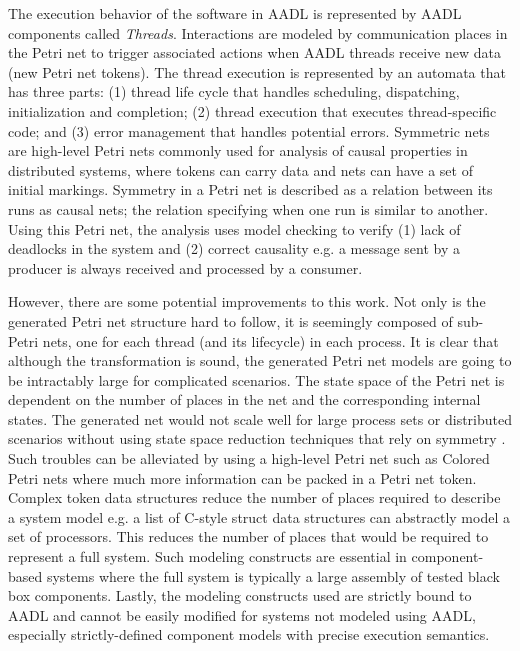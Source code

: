 The execution behavior of the software in AADL is represented by AADL components
called \emph{Threads}. Interactions are modeled by communication places in the
Petri net to trigger associated actions when AADL threads receive new data (new
Petri net tokens). The thread execution is represented by an automata that has
three parts: (1) thread life cycle that handles scheduling, dispatching,
initialization and completion; (2) thread execution that executes
thread-specific code; and (3) error management that handles potential errors.
Symmetric nets \cite{hayman2008symmetry, winskel2009events} are high-level Petri
nets commonly used for analysis of causal properties in distributed systems,
where tokens can carry data and nets can have a set of initial markings.
Symmetry in a Petri net is described as a relation between its runs as causal
nets; the relation specifying when one run is similar to another. Using this
Petri net, the analysis uses model checking to verify (1) lack of deadlocks in
the system and (2) correct causality e.g. a message sent by a producer is always
received and processed by a consumer.

However, there are some potential improvements to this work. Not only is the
generated Petri net structure hard to follow, it is seemingly composed of
sub-Petri nets, one for each thread (and its lifecycle) in each process. It is
clear that although the transformation is sound, the generated Petri net models
are going to be intractably large for complicated scenarios. The state space of
the Petri net is dependent on the number of places in the net and the
corresponding internal states. The generated net would not scale well for large
process sets or distributed scenarios without using state space reduction
techniques that rely on symmetry \cite{sistla2004symmetry}. Such troubles can be
alleviated by using a high-level Petri net such as Colored Petri nets where much
more information can be packed in a Petri net token. Complex token data
structures reduce the number of places required to describe a system model e.g.
a list of C-style struct data structures can abstractly model a set of
processors. This reduces the number of places that would be required to
represent a full system. Such modeling constructs are essential in
component-based systems where the full system is typically a large assembly of
tested black box components. Lastly, the modeling constructs used are strictly
bound to AADL and cannot be easily modified for systems not modeled using AADL,
especially strictly-defined component models with precise execution semantics.

